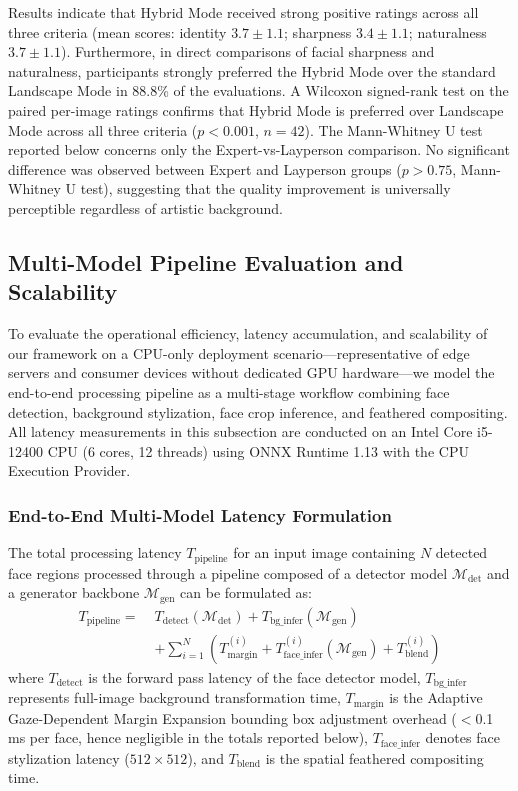 \documentclass[journal]{IEEEtran}
\begin{document}
Results indicate that Hybrid Mode received strong positive ratings across all three criteria (mean scores: identity $3.7 \pm 1.1$; sharpness $3.4 \pm 1.1$; naturalness $3.7 \pm 1.1$). Furthermore, in direct comparisons of facial sharpness and naturalness, participants strongly preferred the Hybrid Mode over the standard Landscape Mode in 88.8\% of the evaluations. A Wilcoxon signed-rank test on the paired per-image ratings confirms that Hybrid Mode is preferred over Landscape Mode across all three criteria ($p < 0.001$, $n = 42$). The Mann-Whitney U test reported below concerns only the Expert-vs-Layperson comparison. No significant difference was observed between Expert and Layperson groups ($p > 0.75$, Mann-Whitney U test), suggesting that the quality improvement is universally perceptible regardless of artistic background.

\subsection{Multi-Model Pipeline Evaluation and Scalability}
\label{subsec:multimodel_pipeline}

To evaluate the operational efficiency, latency accumulation, and scalability of our framework on a CPU-only deployment scenario---representative of edge servers and consumer devices without dedicated GPU hardware---we model the end-to-end processing pipeline as a multi-stage workflow combining face detection, background stylization, face crop inference, and feathered compositing. All latency measurements in this subsection are conducted on an Intel Core i5-12400 CPU (6 cores, 12 threads) using ONNX Runtime 1.13 with the CPU Execution Provider.

\subsubsection{End-to-End Multi-Model Latency Formulation}
The total processing latency $T_{\text{pipeline}}$ for an input image containing $N$ detected face regions processed through a pipeline composed of a detector model $\mathcal{M}_{\text{det}}$ and a generator backbone $\mathcal{M}_{\text{gen}}$ can be formulated as:
\begin{equation}
\begin{aligned}
T_{\text{pipeline}} = \; & T_{\text{detect}}(\mathcal{M}_{\text{det}}) + T_{\text{bg\_infer}}(\mathcal{M}_{\text{gen}}) \\
& + \sum_{i=1}^{N} \left( T_{\text{margin}}^{(i)} + T_{\text{face\_infer}}^{(i)}(\mathcal{M}_{\text{gen}}) + T_{\text{blend}}^{(i)} \right)
\end{aligned}
\label{eq:pipeline_latency}
\end{equation}
where $T_{\text{detect}}$ is the forward pass latency of the face detector model, $T_{\text{bg\_infer}}$ represents full-image background transformation time, $T_{\text{margin}}$ is the Adaptive Gaze-Dependent Margin Expansion bounding box adjustment overhead ($<$0.1\,ms per face, hence negligible in the totals reported below), $T_{\text{face\_infer}}$ denotes face stylization latency ($512 \times 512$), and $T_{\text{blend}}$ is the spatial feathered compositing time.
\end{document}
